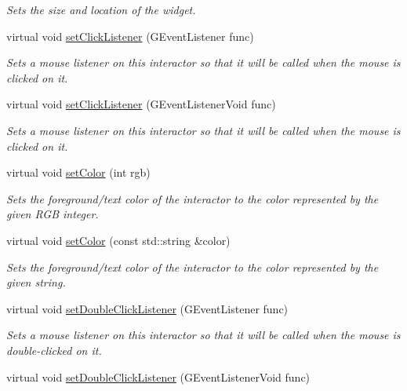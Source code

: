 \begin{DoxyCompactItemize}
\begin{DoxyCompactList}\small\item\em Sets the size and location of the widget. \end{DoxyCompactList}\item 
virtual void \mbox{\hyperlink{classGInteractor_abd40af6921242584d0954f173911b190}{set\+Click\+Listener}} (G\+Event\+Listener func)
\begin{DoxyCompactList}\small\item\em Sets a mouse listener on this interactor so that it will be called when the mouse is clicked on it. \end{DoxyCompactList}\item 
virtual void \mbox{\hyperlink{classGInteractor_a856414c92df90f56f3877475eb3f8fc4}{set\+Click\+Listener}} (G\+Event\+Listener\+Void func)
\begin{DoxyCompactList}\small\item\em Sets a mouse listener on this interactor so that it will be called when the mouse is clicked on it. \end{DoxyCompactList}\item 
virtual void \mbox{\hyperlink{classGInteractor_ab1f5cc0f5cc6bbbd716a526c61f1081d}{set\+Color}} (int rgb)
\begin{DoxyCompactList}\small\item\em Sets the foreground/text color of the interactor to the color represented by the given R\+GB integer. \end{DoxyCompactList}\item 
virtual void \mbox{\hyperlink{classGInteractor_a61374df6c11b52cfbb0815decdbaebc6}{set\+Color}} (const std\+::string \&color)
\begin{DoxyCompactList}\small\item\em Sets the foreground/text color of the interactor to the color represented by the given string. \end{DoxyCompactList}\item 
virtual void \mbox{\hyperlink{classGInteractor_ac29f9a3462458e165fae3a1f046ee77a}{set\+Double\+Click\+Listener}} (G\+Event\+Listener func)
\begin{DoxyCompactList}\small\item\em Sets a mouse listener on this interactor so that it will be called when the mouse is double-\/clicked on it. \end{DoxyCompactList}\item 
virtual void \mbox{\hyperlink{classGInteractor_a50096194d66f48c92dd4c512d41bfc76}{set\+Double\+Click\+Listener}} (G\+Event\+Listener\+Void func)

\end{DoxyCompactItemize}
